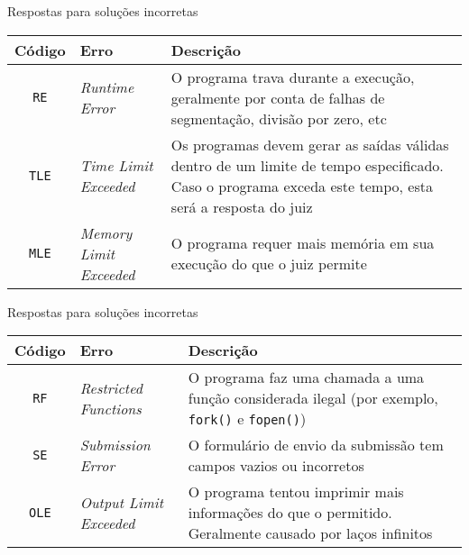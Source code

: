 \begin{frame}[fragile]{Respostas para soluções incorretas}

    \begin{center}
        \begin{tabularx}{\textwidth}{clX}
            \toprule
            \textbf{Código} & \textbf{Erro} & \textbf{Descrição} \\
            \midrule
            \rowcolor[gray]{0.9}
            \texttt{RE} & \textit{Runtime Error} & O programa trava  durante  a execução, geralmente por conta de falhas de segmentação, divisão por zero, etc \\
            \midrule
            \texttt{TLE} & \textit{Time Limit Exceeded} & Os  programas  devem  gerar  as saídas  válidas dentro de um limite de tempo especificado. Caso o programa exceda este tempo, esta será a resposta do juiz \\
            \midrule
            \rowcolor[gray]{0.9}
            \texttt{MLE} & \textit{Memory Limit Exceeded} & O programa requer mais  memória
  em sua execução do que o juiz permite \\
        \bottomrule
        \end{tabularx}
    \end{center}

\end{frame}

\begin{frame}[fragile]{Respostas para soluções incorretas}

    \begin{center}
        \begin{tabularx}{\textwidth}{clX}
            \toprule
            \textbf{Código} & \textbf{Erro} & \textbf{Descrição} \\
            \midrule
            \texttt{RF} & \textit{Restricted Functions} & O programa faz uma chamada a uma
  função considerada ilegal (por exemplo, \texttt{fork()} e \texttt{fopen()}) \\
            \midrule
            \rowcolor[gray]{0.9}
            \texttt{SE} & \textit{Submission Error} & O formulário de envio  da  submissão tem campos vazios ou incorretos \\
            \midrule
            \texttt{OLE} & \textit{Output Limit Exceeded} & O programa tentou imprimir mais informações do que o permitido. Geralmente  causado  por  laços infinitos \\
        \bottomrule
        \end{tabularx}
    \end{center}

\end{frame}

